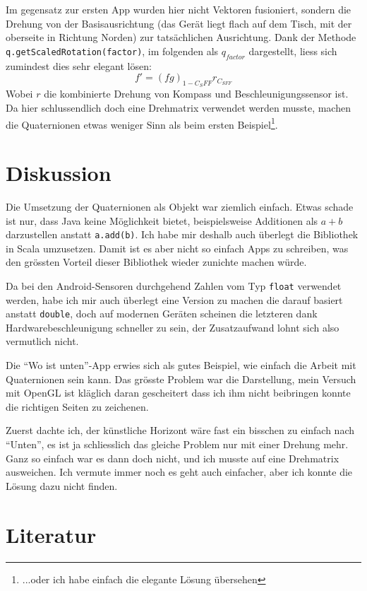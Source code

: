 \documentclass[12pt]{article}
\begin{document}
  Im gegensatz zur ersten App wurden hier nicht Vektoren fusioniert, sondern die Drehung von der Basisausrichtung (das Gerät liegt flach auf dem Tisch, mit der oberseite in Richtung Norden) zur tatsächlichen Ausrichtung. Dank der Methode \texttt{q.getScaledRotation(factor)}, im folgenden als $q_{factor}$ dargestellt, liess sich zumindest dies sehr elegant lösen:
  $$ f' = (f g)_{1-C_SFF} r_{C_{SFF}} $$
  Wobei $r$ die kombinierte Drehung von Kompass und Beschleunigungssensor ist.  Da hier schlussendlich doch eine Drehmatrix verwendet werden musste, machen die Quaternionen etwas weniger Sinn als beim ersten Beispiel\footnote{...oder ich habe einfach die elegante Lösung übersehen}.


  \section{Diskussion}

  Die Umsetzung der Quaternionen als Objekt war ziemlich einfach. Etwas schade ist nur, dass Java keine Möglichkeit bietet, beispielsweise Additionen als $a + b$ darzustellen anstatt \texttt{a.add(b)}. Ich habe mir deshalb auch überlegt die Bibliothek in Scala umzusetzen. Damit ist es aber nicht so einfach Apps zu schreiben, was den grössten Vorteil dieser Bibliothek wieder zunichte machen würde.

  Da bei den Android-Sensoren durchgehend Zahlen vom Typ \texttt{float} verwendet werden, habe ich mir auch überlegt eine Version zu machen die darauf basiert anstatt \texttt{double}, doch auf modernen Geräten scheinen die letzteren dank Hardwarebeschleunigung schneller zu sein, der Zusatzaufwand lohnt sich also vermutlich nicht.

  Die ``Wo ist unten''-App erwies sich als gutes Beispiel, wie einfach die Arbeit mit Quaternionen sein kann. Das grösste Problem war die Darstellung, mein Versuch mit OpenGL ist kläglich daran gescheitert dass ich ihm nicht beibringen konnte die richtigen Seiten zu zeichenen.

  Zuerst dachte ich, der künstliche Horizont wäre fast ein bisschen zu einfach nach ``Unten'', es ist ja schliesslich das gleiche Problem nur mit einer Drehung mehr. Ganz so einfach war es dann doch nicht, und ich musste auf eine Drehmatrix ausweichen. Ich vermute immer noch es geht auch einfacher, aber ich konnte die Lösung dazu nicht finden.


  \section{Literatur}
\end{document}
